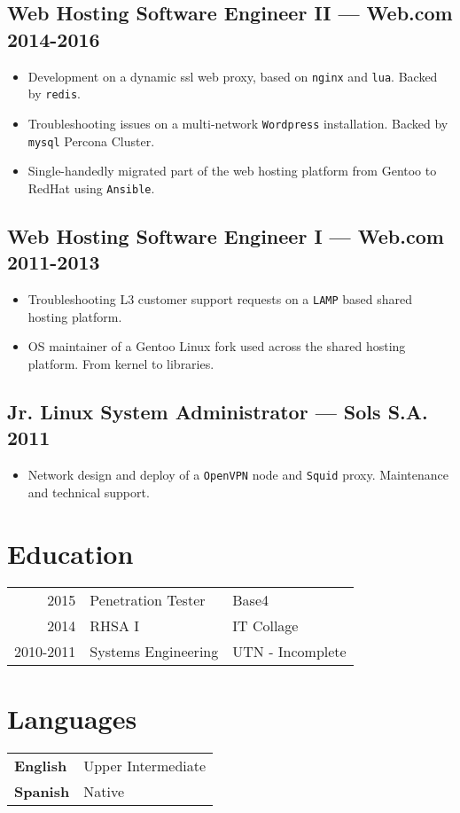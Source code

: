 \documentclass[11pt]{article}
\begin{document}
\subsection{Web Hosting Software Engineer II --- Web.com \hfill 2014-2016}
\begin{itemize}
\item Development on a dynamic ssl web proxy, based on \texttt{nginx} and \texttt{lua}. Backed by \texttt{redis}.
\item Troubleshooting issues on a multi-network \texttt{Wordpress} installation. Backed by \texttt{mysql} Percona Cluster.
\item Single-handedly migrated part of the web hosting platform from Gentoo to RedHat using \texttt{Ansible}.
\end{itemize}

\subsection{Web Hosting Software Engineer I --- Web.com \hfill 2011-2013}
\begin{itemize}
\item Troubleshooting L3 customer support requests on a \texttt{LAMP} based shared hosting platform.
\item OS maintainer of a Gentoo Linux fork used across the shared hosting platform. From kernel to libraries.
\end{itemize}

\subsection{Jr. Linux System Administrator --- Sols S.A. \hfill 2011}
\begin{itemize}
\item Network design and deploy of a \texttt{OpenVPN} node and \texttt{Squid} proxy. Maintenance and technical support.
\end{itemize}

\begin{multicols}{2}
  \section{Education}
    \begin{tabular}{ @{}r | p{} | l }
      2015      & Penetration Tester  & Base4 \\
      2014      & RHSA I              & IT Collage \\
      2010-2011 & Systems Engineering & UTN - Incomplete
    \end{tabular}
  \columnbreak
  \section{Languages}
  \begin{tabular}{ l l }
    \hspace{.1em} \textbf{English} & Upper Intermediate \\
    \hspace{.1em} \textbf{Spanish} & Native \\
  \end{tabular}
\end{multicols}
\end{document}
